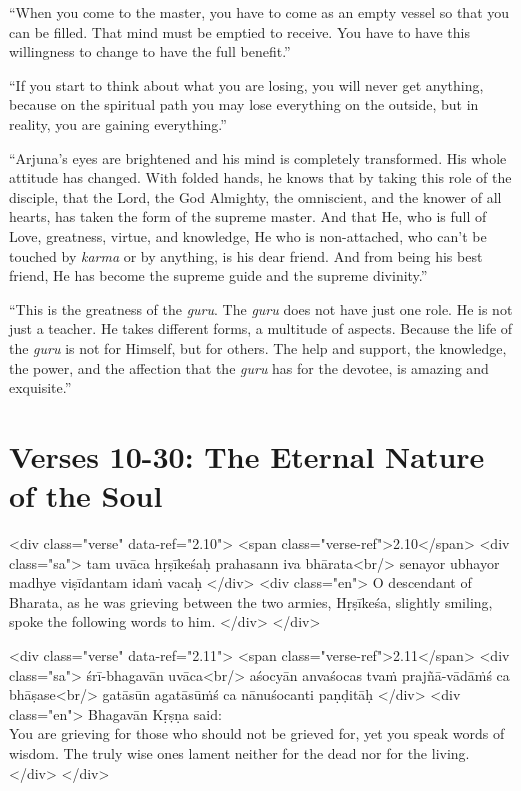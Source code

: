 \enquote{When you come to the master, you have to come as an empty vessel so that you can be filled. That mind must be emptied to receive. You have to have this willingness to change to have the full benefit.}

\enquote{If you start to think about what you are losing, you will never get anything, because on the spiritual path you may lose everything on the outside, but in reality, you are gaining everything.}

\enquote{Arjuna’s eyes are brightened and his mind is completely transformed. His whole attitude has changed. With folded hands, he knows that by taking this role of the disciple, that the Lord, the God Almighty, the omniscient, and the knower of all hearts, has taken the form of the supreme master. And that He, who is full of Love, greatness, virtue, and knowledge, He who is non-attached, who can’t be touched by \textit{karma} or by anything, is his dear friend. And from being his best friend, He has become the supreme guide and the supreme divinity.}

\enquote{This is the greatness of the \textit{guru}. The \textit{guru} does not have just one role. He is not just a teacher. He takes different forms, a multitude of aspects. Because the life of the \textit{guru} is not for Himself, but for others. The help and support, the knowledge, the power, and the affection that the \textit{guru} has for the devotee, is amazing and exquisite.}

\newpage
\section{Verses 10-30: The Eternal Nature of the Soul}\label{sec-verses-10-30-the-eternal-nature-of-the-soul}


\begin{html}
<div class="verse" data-ref="2.10">
  <span class="verse-ref">2.10</span>
  <div class="sa">
    tam uvāca hṛṣīkeśaḥ prahasann iva bhārata<br/>
    senayor ubhayor madhye viṣīdantam idaṁ vacaḥ
  </div>
  <div class="en">
    O descendant of Bharata, as he was grieving between the two armies, Hṛṣīkeśa, slightly smiling, spoke the following words to him.
  </div>
</div>
\end{html}



\begin{html}
<div class="verse" data-ref="2.11">
  <span class="verse-ref">2.11</span>
  <div class="sa">
    śrī-bhagavān uvāca<br/>
    aśocyān anvaśocas tvaṁ prajñā-vādāṁś ca bhāṣase<br/>
    gatāsūn agatāsūṁś ca nānuśocanti paṇḍitāḥ
  </div>
  <div class="en">
    \hspace*{1em}Bhagavān Kṛṣṇa said: \\ You are grieving for those who should not be grieved for, yet you speak words of wisdom. The truly wise ones lament neither for the dead nor for the living.
  </div>
</div>
\end{html}




